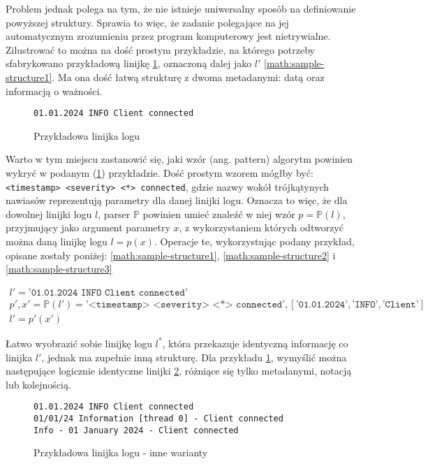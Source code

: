 Problem jednak polega na tym, że nie istnieje uniwersalny sposób na definiowanie
powyższej struktury.
Sprawia to więc, że zadanie polegające na jej automatycznym zrozumieniu przez
program komputerowy jest nietrywialne.
Zilustrować to można na dość prostym przykładzie, na którego potrzeby
sfabrykowano przykładową linijkę \ref{code:sample-line-1}, oznaczoną dalej jako
$l'$ \ref{math:sample-structure1}.
Ma ona dość łatwą strukturę z dwoma metadanymi: datą oraz informacją o ważności.

\begin{figure}[ht]
\begin{verbatim}
01.01.2024 INFO Client connected
\end{verbatim}
\caption{Przykładowa linijka logu}
\label{code:sample-line-1}
\end{figure}

Warto w tym miejscu zastanowić się, jaki wzór (ang. pattern) algorytm powinien wykryć w podanym
(\ref{code:sample-line-1}) przykładzie.
Dość prostym wzorem mógłby być: \texttt{<timestamp> <severity> <*> connected},
gdzie nazwy wokół trójkątynych nawiasów reprezentują parametry dla danej linijki
logu.
Oznacza to więc, że dla dowolnej linijki logu $l$, parser $\mathbb{P}$ powinien umieć
znaleźć w niej wzór $p = \mathbb{P}(l)$, przyjmujący jako argument parametry $x$, z
wykorzystaniem których odtworzyć można daną linijkę logu $l = p(x)$.
Operacje te, wykorzystując podany przykład, opisane zostały poniżej:
\ref{math:sample-structure1}, \ref{math:sample-structure2} i \ref{math:sample-structure3}

\begin{gather}
  l' = \texttt{'01.01.2024 INFO Client connected'}
  \label{math:sample-structure1} \\
  p', x' = \mathbb{P}(l') = \texttt{'<timestamp> <severity> <*> connected'},
  [\texttt{'01.01.2024'}, \texttt{'INFO'}, \texttt{'Client'}]
  \label{math:sample-structure2} \\
  l' = p'(x')
  \label{math:sample-structure3}
\end{gather}

Łatwo wyobrazić sobie linijkę logu $l^*$, która przekazuje identyczną informację
co linijka $l'$, jednak ma zupełnie inną strukturę.
Dla przykładu \ref{code:sample-line-1}, wymyślić można następujące logicznie
identyczne linijki \ref{code:sample-line-2}, różniące się tylko metadanymi,
notacją lub kolejnością.

\begin{figure}[ht]
\begin{verbatim}
01.01.2024 INFO Client connected
01/01/24 Information [thread 0] - Client connected
Info - 01 January 2024 - Client connected
\end{verbatim}
\caption{Przykładowa linijka logu - inne warianty}
\label{code:sample-line-2}
\end{figure}

